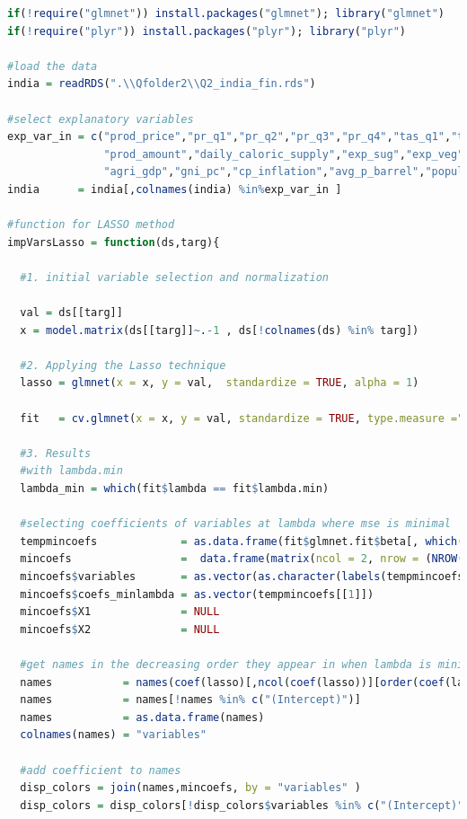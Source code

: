 \documentclass[11pt]{article}
\begin{document}
\begin{lstlisting}[language= R]
if(!require("glmnet")) install.packages("glmnet"); library("glmnet")
if(!require("plyr")) install.packages("plyr"); library("plyr")

#load the data
india = readRDS(".\\Qfolder2\\Q2_india_fin.rds")

#select explanatory variables
exp_var_in = c("prod_price","pr_q1","pr_q2","pr_q3","pr_q4","tas_q1","tas_q2","tas_q3","tas_q4",
               "prod_amount","daily_caloric_supply","exp_sug","exp_veg","exp_cer","imp_sug","imp_veg","imp_cer", 
               "agri_gdp","gni_pc","cp_inflation","avg_p_barrel","population") 
india      = india[,colnames(india) %in%exp_var_in ]

#function for LASSO method  
impVarsLasso = function(ds,targ){
  
  #1. initial variable selection and normalization
  
  val = ds[[targ]]
  x = model.matrix(ds[[targ]]~.-1 , ds[!colnames(ds) %in% targ])
  
  #2. Applying the Lasso technique
  lasso = glmnet(x = x, y = val,  standardize = TRUE, alpha = 1)
  
  fit   = cv.glmnet(x = x, y = val, standardize = TRUE, type.measure ="mse", alpha=1, nfolds=3)
  
  #3. Results
  #with lambda.min
  lambda_min = which(fit$lambda == fit$lambda.min)
  
  #selecting coefficients of variables at lambda where mse is minimal
  tempmincoefs             = as.data.frame(fit$glmnet.fit$beta[, which(fit$lambda == fit$lambda.min)])
  mincoefs                 =  data.frame(matrix(ncol = 2, nrow = (NROW(tempmincoefs))))
  mincoefs$variables       = as.vector(as.character(labels(tempmincoefs)[[1]]))
  mincoefs$coefs_minlambda = as.vector(tempmincoefs[[1]])
  mincoefs$X1              = NULL
  mincoefs$X2              = NULL
  
  #get names in the decreasing order they appear in when lambda is minimal
  names           = names(coef(lasso)[,ncol(coef(lasso))][order(coef(lasso)[,ncol(coef(lasso))],decreasing=TRUE)])
  names           = names[!names %in% c("(Intercept)")]
  names           = as.data.frame(names)
  colnames(names) = "variables"
  
  #add coefficient to names
  disp_colors = join(names,mincoefs, by = "variables" )
  disp_colors = disp_colors[!disp_colors$variables %in% c("(Intercept)"),]
  

\end{lstlisting}
\end{document}
